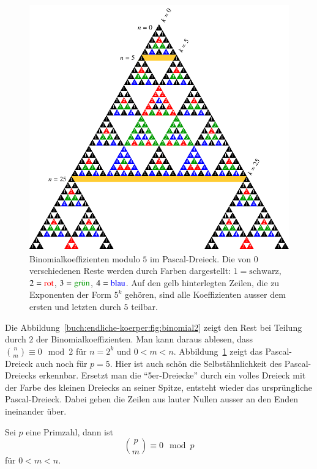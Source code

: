\begin{figure}
\centering
\includegraphics{chapters/30-endlichekoerper/images/binomial5.pdf}
\caption{Binomialkoeffizienten modulo $5$ im Pascal-Dreieck.
Die von $0$ verschiedenen Reste werden durch Farben dargestellt:
$1=\text{schwarz}$,
$2=\text{\color{farbe2}rot}$,
$3=\text{\color{farbe3}grün}$,
$4=\text{\color{farbe4}blau}$.
Auf den gelb hinterlegten Zeilen, die zu Exponenten der Form $5^k$ gehören,
sind alle Koeffizienten ausser dem ersten und letzten durch $5$ teilbar.
\label{buch:endliche-koerper:fig:binomial5}}
\end{figure}
\egroup
Die Abbildung~\ref{buch:endliche-koerper:fig:binomial2} zeigt den
Rest bei Teilung durch $2$ der Binomialkoeffizienten.
Man kann daraus ablesen, dass $\binom{n}{m}\equiv 0\mod 2$ für $n=2^k$ 
und $0<m<n$.
Abbildung~\ref{buch:endliche-koerper:fig:binomial5} zeigt das Pascal-Dreieck
auch noch für $p=5$.
Hier ist auch schön die Selbstähnlichkeit des Pascal-Dreiecks erkennbar.
Ersetzt man die ``5er-Dreiecke'' durch ein volles Dreieck mit der Farbe
des kleinen Dreiecks an seiner Spitze, entsteht wieder das ursprüngliche
Pascal-Dreieck.
Dabei gehen die Zeilen aus lauter Nullen ausser an den Enden ineinander über.

\begin{satz}
\label{buch:endliche-koerper:satz:binom}
Sei $p$ eine Primzahl, dann ist
\[
\binom{p}{m} \equiv 0\mod p
\]
für $0<m<n$.
\end{satz}

